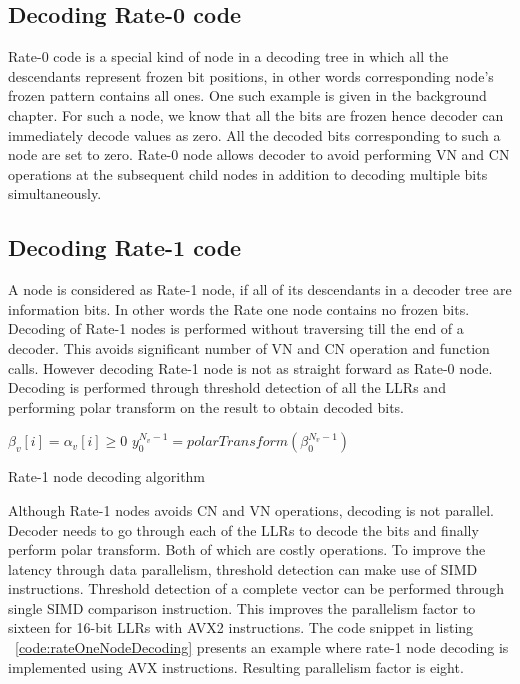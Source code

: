 \subsection{Decoding Rate-0 code}
Rate-0 code is a special kind of node in a decoding tree in which all the descendants represent frozen bit positions, in other words corresponding node's frozen pattern contains all ones. One such example is given in the background chapter. For such a node, we know that all the bits are frozen hence decoder can immediately decode values as zero. All the decoded bits corresponding to such a node are set to zero. Rate-0 node allows decoder to avoid performing VN and CN operations at the subsequent child nodes in addition to decoding multiple bits simultaneously.

\subsection{Decoding Rate-1 code}
A node is considered as Rate-1 node, if all of its descendants in a decoder tree are information bits. In other words the Rate one node contains no frozen bits. Decoding of Rate-1 nodes is performed without traversing till the end of a decoder. This avoids significant number of VN and CN operation and function calls. However decoding Rate-1 node is not as straight forward as Rate-0 node. Decoding is performed through threshold detection of all the LLRs and performing polar transform on the result to obtain decoded bits.

\IncMargin{1.5em}
\begin{algorithm}[]
	 {
		 {
			$\beta_{v}[i] = \alpha_{v}[i] \ge 0$\;
		}
		$y_{0}^{N_v-1} = polarTransform(\beta_{0}^{N_v-1})$ \;
	}
	\caption{Rate-1 node decoding algorithm}
	\label{algo:R1Decoding}
\end{algorithm}
\DecMargin{1.5em}

Although Rate-1 nodes avoids CN and VN operations, decoding is not parallel. Decoder needs to go through each of the LLRs to decode the bits and finally perform polar transform. Both of which are costly operations. To improve the latency through data parallelism, threshold detection can make use of SIMD instructions. Threshold detection of a complete vector can be performed through single SIMD comparison instruction. This improves the parallelism factor to sixteen for 16-bit LLRs with {AVX2} instructions. The code snippet in listing ~\ref{code:rateOneNodeDecoding} presents an example where rate-1 node decoding is implemented using AVX instructions. Resulting parallelism factor is eight.

